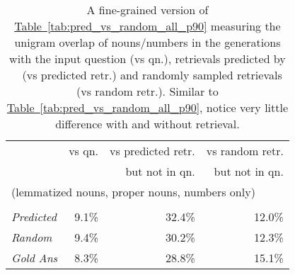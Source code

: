 \documentclass[11pt]{article}
\newcommand{\namedref}[2]{\hyperref[#2]{#1~\ref*{#2}}}
\newcommand{\tableref}[1]{\namedref{Table}{#1}}
\newcommand{\retriever}[1]{\textsc{c-REALM}}
\begin{document}
\begin{table}[t]
\small
\begin{center}
\begin{tabular}{ lrrr } 
 \toprule
  & vs qn. & vs predicted retr. & vs random retr. \\
 & & but not in qn. & but not in qn. \\
\midrule
\multicolumn{4}{l}{(lemmatized nouns, proper nouns, numbers only)} \\\\
\emph{Predicted} & 9.1\% & 32.4\% & 12.0\% \\
\emph{Random} & 9.4\% & 30.2\% & 12.3\% \\
\midrule
\emph{Gold Ans} & 8.3\% & 28.8\% & 15.1\% \\
\bottomrule
\end{tabular}
\end{center}
\caption{A fine-grained version of \tableref{tab:pred_vs_random_all_p90} measuring the unigram overlap of nouns/numbers in the generations with the input question (vs qn.), retrievals predicted by \retriever~ (vs predicted retr.) and randomly sampled retrievals (vs random retr.). Similar to \tableref{tab:pred_vs_random_all_p90}, notice very little difference with and without retrieval.}
\label{tab:pred_vs_random_all_nouns_p90}
\end{table}
\end{document}
